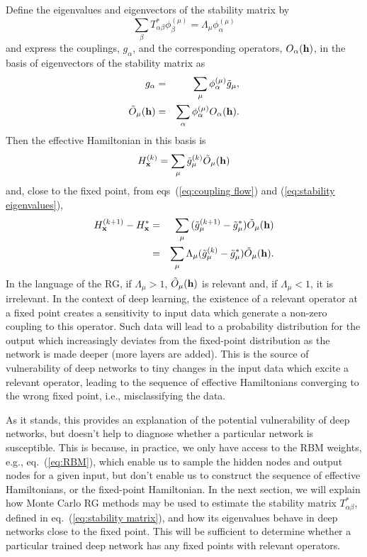 \documentclass[reprint,amsmath,amssymb,aps]{revtex4-1}
\begin{document}
Define the eigenvalues and eigenvectors of the stability matrix by
\begin{equation}
\sum_\beta{T^*_{\alpha\beta} \phi^{(\mu)}_\beta} = \Lambda_\mu \phi^{(\mu)}_\alpha
\label{eq:stability eigenvalues}
\end{equation}
and express the couplings, $g_\alpha$, and the corresponding operators, $O_\alpha({\bf h})$, in the basis of eigenvectors of the stability matrix as
\begin{eqnarray}
g_\alpha &=& \sum_\mu{\phi^{(\mu)}_\alpha} \tilde{g}_\mu,\\
\tilde{O}_\mu({\bf h}) &=& \sum_\alpha{\phi^{(\mu)}_\alpha O_\alpha({\bf h})}.
\label{eq:operators and couplings in eigenbasis}
\end{eqnarray}
Then the effective Hamiltonian in this basis is
\begin{equation}
H^{(k)}_{\bf x} = \sum_\mu{\tilde{g}^{(k)}_\mu \tilde{O}_\mu({\bf h})}
\label{eq:Hamilton in eigenbasis}
\end{equation}
and, close to the fixed point, from eqs~(\ref{eq:coupling flow}) and (\ref{eq:stability eigenvalues}),
\begin{eqnarray}
H^{(k+1)}_{\bf x} - H^*_{\bf x} &=& \sum_\mu{(\tilde{g}^{(k+1)}_\mu - \tilde{g}^*_\mu) \tilde{O}_\mu ({\bf h})} \nonumber\\
                                &=& \sum_\mu{\Lambda_\mu (\tilde{g}^{(k)}_\mu - \tilde{g}^*_\mu) \tilde{O}_\mu ({\bf h})}.
\label{eq:Hamiltonian flow}
\end{eqnarray}
In the language of the RG, if $\Lambda_\mu>1$, $\tilde{O}_\mu({\bf h})$ is relevant and, if $\Lambda_\mu<1$, it is irrelevant. In the context of deep learning, the existence of a relevant operator at a fixed point creates a sensitivity to input data which generate a non-zero coupling to this operator. Such data will lead to a probability distribution for the output which increasingly deviates from the fixed-point distribution as the network is made deeper (more layers are added). This is the source of vulnerability of deep networks to tiny changes in the input data which excite a relevant operator, leading to the sequence of effective Hamiltonians converging to the wrong fixed point, i.e., misclassifying the data.

As it stands, this provides an explanation of the potential vulnerability of deep networks, but doesn't help to diagnose whether a particular network is susceptible. This is because, in practice, we only have access to the RBM weights, e.g., eq.~(\ref{eq:RBM}), which enable us to sample the hidden nodes and output nodes for a given input, but don't enable us to construct the sequence of effective Hamiltonians, or the fixed-point Hamiltonian. In the next section, we will explain how Monte Carlo RG methods may be used to estimate the stability matrix $T^*_{\alpha\beta}$, defined in eq.~(\ref{eq:stability matrix}), and how its eigenvalues behave in deep networks close to the fixed point. This will be sufficient to determine whether a particular trained deep network has any fixed points with relevant operators. 
\end{document}
